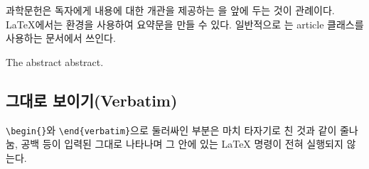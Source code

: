과학문헌은 독자에게 내용에 대한 개관을 제공하는 을 앞에 두는 것이 관례이다.
\LaTeX 에서는  환경을 사용하여 요약문을 만들 수 있다. 일반적으로 는 
article 클래스를 사용하는 문서에서 쓰인다.

\provideenvironment{abstract}%
        {\begin{center}\begin{small}\begin{minipage}{0.8\textwidth}}%
        {\end{minipage}\end{small}\end{center}}
\begin{example}
\begin{abstract}
The abstract abstract.
\end{abstract}
\end{example}

\subsection{그대로 보이기(Verbatim)}

\verb|\begin{|\verb|}|와 \verb|\end{verbatim}|으로 둘러싸인 부분은
마치 타자기로 친 것과 같이 줄나눔, 공백 등이 입력된 그대로 나타나며 그 안에 있는 \LaTeX{}
명령이 전혀 실행되지 않는다.

